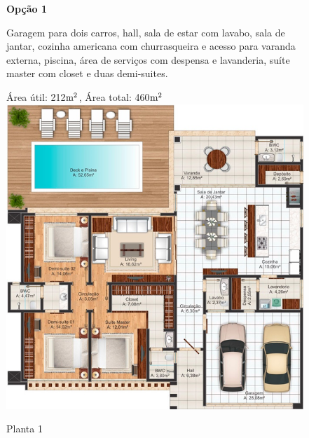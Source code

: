 \begin{figure}
\textbf{Opção 1}

	Garagem para dois carros, hall, sala de estar com lavabo, sala de jantar, cozinha americana com churrasqueira e acesso para varanda externa, piscina, área de serviços com despensa e lavanderia, suíte master com closet e duas demi-suites. 

Área útil: 212$\textup{m}^{2}$, Área total: 460$\textup{m}^{2}$
\centering
\includegraphics[keepaspectratio,scale=0.8]{images/planta1.jpg}
\caption{Planta 1\cite{planta1}}

\end{figure}

